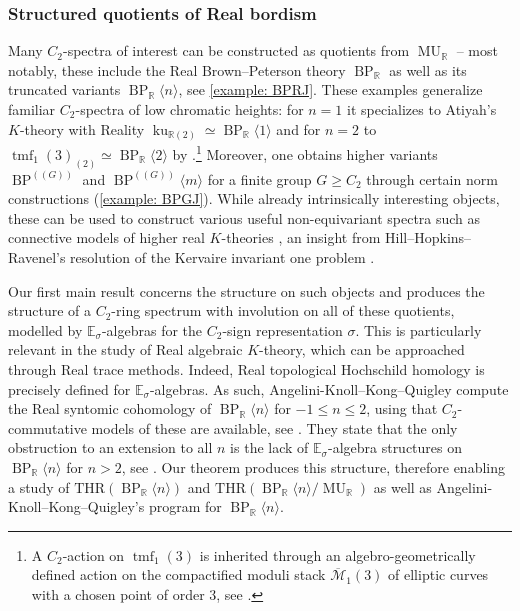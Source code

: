 \documentclass[a4paper, 10pt]{article}
\newcommand{\E}{\mathbb E}  %
\newcommand{\R}{\mathbb R}
\newcommand{\tmf}{\operatorname{tmf}}
\newcommand{\ku}{\operatorname{ku}}
\newcommand{\MU}{\operatorname{MU}}
\newcommand{\MUR}{{\MU_{\mathbb{R}}}}
\newcommand{\BPG}{{\BP^{(\!(G)\!)}}}
\newcommand{\BPGm}{{\BP^{(\!(G)\!)}}\langle m\rangle}
\newcommand{\BP}{\operatorname{BP}}
\newcommand{\BPR}{{\BP_{\mathbb{R}}}}
\newcommand{\BPRn}{{\BP_{\mathbb{R}}\langle n\rangle}}
\newcommand{\ol}{\overline}
\newcommand{\THR}{\mathrm{THR}}
\theoremstyle{definition}
\begin{document}
\subsubsection*{Structured quotients of Real bordism}
Many $C_2$-spectra of interest can be constructed as quotients from $\MUR$ -- most notably, these include the Real Brown--Peterson theory $\BPR$ as well as its truncated variants $\BPRn$, see \cref{example: BPRJ}. These examples generalize familiar $C_2$-spectra of low chromatic heights: for $n = 1$ it specializes to Atiyah's $K$-theory with Reality $\ku_{\R(2)} \simeq \BPR \langle 1 \rangle$ and for $n = 2$ to $\tmf_1(3)_{(2)} \simeq \BPR \langle 2 \rangle$ by \cite{hillmeier2017}.\footnote{A $C_2$-action on $\tmf_1(3)$ is inherited through an algebro-geometrically defined action on the compactified moduli stack $\ol{\mathcal{M}}_1(3)$ of elliptic curves with a chosen point of order $3$, see \cite{hillmeier2017}.} Moreover, one obtains higher variants $\BPG$ and $\BPGm$ for a finite group $G \geq C_2$ through certain norm constructions (\cref{example: BPGJ}). While already intrinsically interesting objects, these can be used to construct various useful non-equivariant spectra such as connective models of higher real $K$-theories \cite{beaudryHillShiZeng2021modelsLubinTate, carrick2025higherrealktheoriesfinite}, an insight from Hill--Hopkins--Ravenel's resolution of the Kervaire invariant one problem \cite{HHR16}.

Our first main result concerns the structure on such objects and produces the structure of a $C_2$-ring spectrum with involution on all of these quotients, modelled by $\E_{\sigma}$-algebras for the $C_2$-sign representation $\sigma$. This is particularly relevant in the study of Real algebraic $K$-theory, which can be approached through Real trace methods. Indeed, Real topological Hochschild homology \cite{hesselholtMadsen2015Realalgebra, dottoMoiPatchkoriaReeh2021THR} is precisely defined for $\E_{\sigma}$-algebras. As such, Angelini-Knoll--Kong--Quigley compute the Real syntomic cohomology of \(\BPRn\) for \(-1\leq n\leq 2\), using that $C_2$-commutative models of these are available, see \cite[Theorem D]{gabe2025realsyntomiccohomology}.
They state that the only obstruction to an extension to all \(n\) is the lack of \(\E_\sigma\)-algebra structures on \(\BPRn\) for \(n>2\), see \cite[p.~4]{gabe2025realsyntomiccohomology}. Our theorem produces this structure, therefore enabling a study of $\THR(\BPRn)$ and $\THR(\BPRn/\MUR)$ as well as Angelini-Knoll--Kong--Quigley's program for $\BPRn$.
\end{document}

